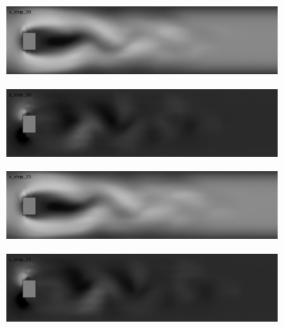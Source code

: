 \documentclass{llncs}
\begin{document}
\begin{figure}[H]
  \begin{subfigure}{.5\textwidth}
    \centering
    \includegraphics[width=1\linewidth]{imgs/sims/fluid/x_step_10}  
  \end{subfigure}
  \begin{subfigure}{.5\textwidth}
    \centering
    \includegraphics[width=1\linewidth]{imgs/sims/fluid/y_step_10}  
  \end{subfigure}
  
  \begin{subfigure}{.5\textwidth}
    \centering
    \includegraphics[width=1\linewidth]{imgs/sims/fluid/x_step_15}  
  \end{subfigure}
  \begin{subfigure}{.5\textwidth}
    \centering
    \includegraphics[width=1\linewidth]{imgs/sims/fluid/y_step_15}  
  \end{subfigure}


\end{figure}
\end{document}

